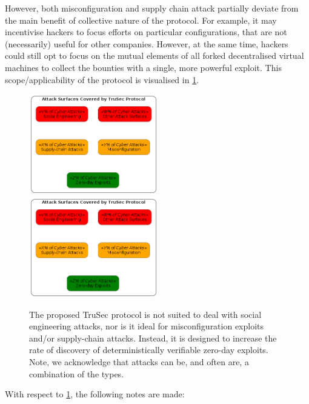 However, both misconfiguration and supply chain attack partially deviate from the main benefit of collective nature of the protocol. For example, it may incentivise hackers to focus efforts on particular configurations, that are not (necessarily) useful for other companies. However, at the same time, hackers could still opt to focus on the mutual elements of all forked decentralised virtual machines to collect the bounties with a single, more powerful exploit. This scope/applicability of the protocol is visualised in \cref{fig:protocol_scope}.
\begin{figure}[H]
    \centering
    \ifx\homepath\overleafhome
        \includegraphics[width=0.50\textwidth]{Images/Diagrams/scope.png}
    \else
        \includegraphics[width=0.50\textwidth]{latex/Images/Diagrams/scope.png}
    \fi
    \caption{The proposed TruSec protocol is not suited to deal with social engineering attacks, nor is it ideal for misconfiguration exploits and/or supply-chain attacks. Instead, it is designed to increase the rate of discovery of deterministically verifiable zero-day exploits. Note, we acknowledge that attacks can be, and often are, a combination of the types.}
    \label{fig:protocol_scope}
\end{figure}
With respect to \cref{fig:protocol_scope}, the following notes are made:
